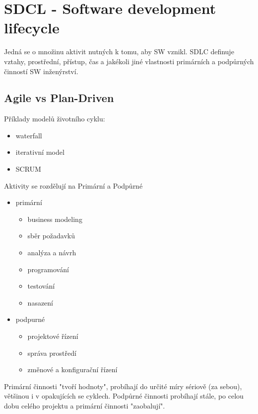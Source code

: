 \documentclass{szzclass}
\begin{document}
\tableofcontents
\newpage

\section{SDCL - Software development lifecycle}
Jedná se o množinu aktivit nutných k tomu, aby SW vznikl. SDLC definuje vztahy, prostřední, přístup, čas a jakékoli jiné vlastnosti primárních a podpůrných činností
SW inženýrství.
\subsection{Agile vs Plan-Driven}
Příklady modelů životního cyklu:
\begin{itemize}
    \item waterfall
    \item iterativní model
    \item SCRUM
\end{itemize}

Aktivity se rozdělují na Primární a Podpůrné
\begin{itemize}
    \item primární
    \begin{itemize}
        \item business modeling
        \item sběr požadavků
        \item analýza a návrh
        \item programování
        \item testování
        \item nasazení
    \end{itemize}
    \item podpurné
    \begin{itemize}
        \item projektové řízení
        \item správa prostředí
        \item změnové a konfigurační řízení
    \end{itemize}
\end{itemize}

Primární činnosti "tvoří hodnoty", probíhají do určité míry sériově (za sebou), většinou i v opakujících se cyklech.
\newline
Podpůrné činnosti probíhají stále, po celou dobu celého projektu a primární činnosti "zaobalují".
\end{document}
